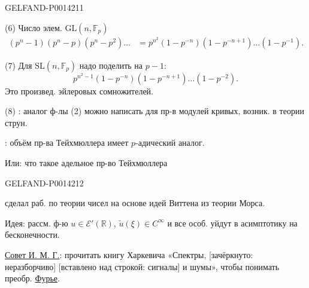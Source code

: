 \begin{GelfandAdjacentEvidence}{GELFAND-P001421}{1}

(6) Число элем. \(\mathrm{GL}(n,\mathbb F_p)\)
\[
\begin{aligned}
 (p^n-1)(p^n-p)(p^n-p^2)\ldots
 &=
 p^{n^2}(1-p^{-n})(1-p^{-n+1})\ldots(1-p^{-1}).
\end{aligned}
\]

(7) Для \(\mathrm{SL}(n,\mathbb F_p)\) надо поделить на \(p-1\):
\[
 p^{n^2-1}(1-p^{-n})(1-p^{-n+1})\ldots(1-p^{-2}).
\]
Это произвед. эйлеровых сомножителей.

(8) : аналог ф-лы (2) можно написать для пр-в модулей кривых, возник. в теории струн.


: объём пр-ва Тейхмюллера имеет \(p\)-адический аналог.

Или: что такое адельное пр-во Тейхмюллера

\end{GelfandAdjacentEvidence}
\begin{GelfandAdjacentEvidence}{GELFAND-P001421}{2}


 сделал раб. по теории чисел на основе идей Виттена из теории Морса.

Идея: рассм. ф-ю \(u\in\mathcal E'(\mathbb R)\),
\(\widetilde u(\xi)\in C^\infty\) и все особ. уйдут в асимптотику на бесконечности.

\uline{Совет И. М. Г.}: прочитать книгу Харкевича «Спектры,
[зачёркнуто: неразборчиво] [вставлено над строкой: сигналы] и шумы»,
чтобы понимать преобр. \uline{Фурье}.
\end{GelfandAdjacentEvidence}
